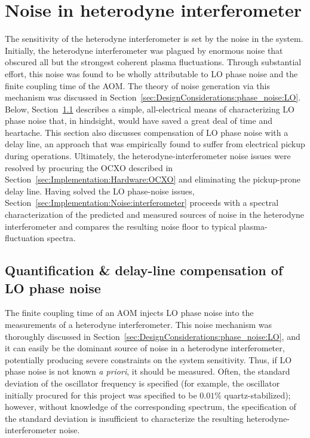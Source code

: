 \section{Noise in heterodyne interferometer}
\label{sec:Implementation:Noise}
The sensitivity of the heterodyne interferometer
is set by the noise in the system.
Initially, the heterodyne interferometer
was plagued by enormous noise that obscured
all but the strongest coherent plasma fluctuations.
Through substantial effort,
this noise was found to be wholly attributable to
LO phase noise and the finite coupling time of the AOM.
The theory of noise generation via this mechanism was discussed
in Section~\ref{sec:DesignConsiderations:phase_noise:LO}.
Below, Section~\ref{sec:Implementation:Noise:LO}
describes a simple, all-electrical means
of characterizing LO phase noise that, in hindsight,
would have saved a great deal of time and heartache.
This section also discusses compensation
of LO phase noise with a delay line,
an approach that was empirically found to suffer from electrical pickup
during \diiid\space operations.
Ultimately, the heterodyne-interferometer noise issues
were resolved by procuring the OCXO described in
Section~\ref{sec:Implementation:Hardware:OCXO} and
eliminating the pickup-prone delay line.
Having solved the LO phase-noise issues,
Section~\ref{sec:Implementation:Noise:interferometer}
proceeds with a spectral characterization
of the predicted and measured sources of noise
in the heterodyne interferometer and
compares the resulting noise floor
to typical plasma-fluctuation spectra.


\subsection{Quantification \& delay-line compensation of LO phase noise}
\label{sec:Implementation:Noise:LO}
The finite coupling time of an AOM injects LO phase noise
into the measurements of a heterodyne interferometer.
This noise mechanism was thoroughly discussed
in Section~\ref{sec:DesignConsiderations:phase_noise:LO}, and
it can easily be the dominant source of noise in a heterodyne interferometer,
potentially producing severe constraints on the system sensitivity.
Thus, if LO phase noise is not known \emph{a priori},
it should be measured.
Often, the standard deviation of the oscillator frequency is specified
(for example, the oscillator initially procured for this project
was specified to be $0.01\%$ quartz-stabilized);
however, without knowledge of the corresponding spectrum,
the specification of the standard deviation
is insufficient to characterize the resulting
heterodyne-interferometer noise.

